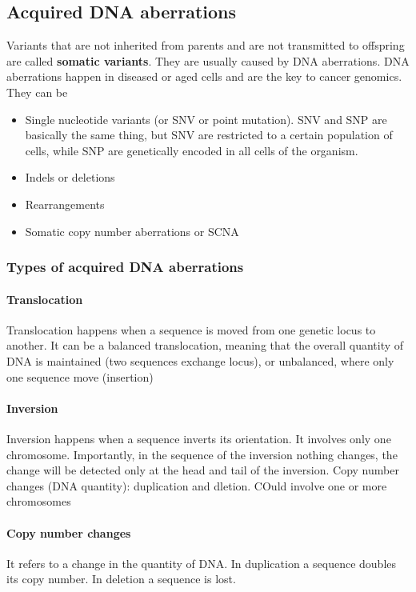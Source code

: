 \subsection{Acquired DNA aberrations}
Variants that are not inherited from parents and are not transmitted to offspring are called \textbf{somatic variants}. 
They are usually caused by DNA aberrations.
DNA aberrations happen in diseased or aged cells and are the key to cancer genomics.
They can be 
\begin{itemize}
\item  Single nucleotide variants (or SNV or point mutation). SNV and SNP are basically the same thing, but SNV are restricted to a certain population of cells, while SNP are genetically encoded in all cells of the organism.
\item Indels or deletions
\item Rearrangements
\item Somatic copy number aberrations or SCNA
\end{itemize}

		\subsubsection{Types of acquired DNA aberrations} \label{subsec:aberrations}
		

			\paragraph{Translocation}
			Translocation happens when a sequence is moved from one genetic locus to another.
			It can be a balanced translocation, meaning that the overall quantity of DNA is maintained (two sequences exchange locus), or unbalanced, where only one sequence move (insertion) 

			\paragraph{Inversion}
			Inversion happens when a sequence inverts its orientation. It involves only one 		chromosome.
			Importantly, in the sequence of the inversion nothing changes, the change will be detected only at the head and tail of the inversion.
Copy number changes (DNA quantity): duplication and dletion. COuld involve one or more chromosomes

			\paragraph{Copy number changes}
			It refers to a change in the quantity of DNA. 
			In duplication a sequence doubles its copy number.
			In deletion a sequence is lost.


